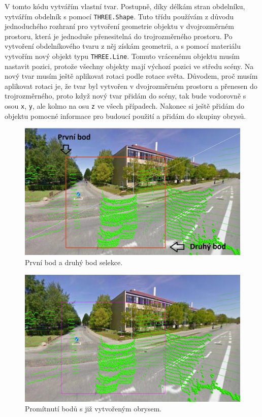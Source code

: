 \documentclass[czech,bachelor,dept420,male,cpdeclaration]{diploma}
\begin{document}
V tomto kódu vytvářím vlastní tvar. Postupně, díky délkám stran obdelníku, vytvářím obdelník s pomocí \texttt{THREE.Shape}. Tuto třídu používám z důvodu jednoduchého rozhraní pro vytvoření geometrie objektu v dvojrozměrném prostoru, která je jednoduše přenesitelná do trojrozměrného prostoru. Po vytvoření obdelníkového tvaru z něj získám geometrii, a s pomocí materiálu vytvořím nový objekt typu \texttt{THREE.Line}. Tomuto vrácenému objektu musím nastavit pozici, protože všechny objekty mají výchozí pozici ve středu scény. Na nový tvar musím ještě aplikovat rotaci podle rotace světa. Důvodem, proč musím aplikovat rotaci je, že tvar byl vytvořen v dvojrozměrném prostoru a přenesen do trojrozměrného, proto když nový tvar přidám do scény, tak bude vodorovně s osou \texttt{x}, \texttt{y}, ale kolmo na osu \texttt{z} ve všech případech. Nakonec si ještě přidám do objektu pomocné informace pro budoucí použití a přidám do skupiny obrysů.

\begin{figure}[H]
\centering
\includegraphics[width=\linewidth]{Figures/selectionBeforeProjection.png}
\caption{První bod a druhý bod selekce. }
\label{fig:selectionBefore}
\end{figure} 

\begin{figure}[H]
\centering
\includegraphics[width=\linewidth]{Figures/selectionAfterProjection.png}
\caption{Promítnutí bodů s již vytvořeným obrysem. }
\label{fig:selectionAfter}
\end{figure}
\end{document}
